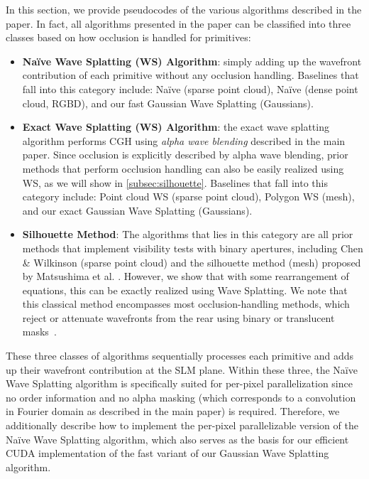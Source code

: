 In this section, we provide pseudocodes of the various algorithms described in the paper. In fact, all algorithms presented in the paper can be classified into three classes based on how occlusion is handled for primitives: 
\begin{itemize}
    \item \textbf{Na\"ive Wave Splatting (WS) Algorithm}: simply adding up the wavefront contribution of each primitive without any occlusion handling. Baselines that fall into this category include: Na\"ive (sparse point cloud), Na\"ive (dense point cloud, RGBD), and our fast Gaussian Wave Splatting (Gaussians). 
    \item  \textbf{Exact Wave Splatting (WS) Algorithm}: the exact wave splatting algorithm performs CGH using \textit{alpha wave blending} described in the main paper. Since occlusion is explicitly described by alpha wave blending, prior methods that perform occlusion handling can also be easily realized using WS, as we will show in \ref{subsec:silhouette}. Baselines that fall into this category include: Point cloud WS (sparse point cloud), Polygon WS (mesh), and our exact Gaussian Wave Splatting (Gaussians). 
    \item \textbf{Silhouette Method}: The algorithms that lies in this category are all prior methods that implement visibility tests with binary apertures, including Chen \& Wilkinson \cite{chen2009computer} (sparse point cloud) and the silhouette method (mesh) proposed by Matsushima et al. \cite{matsushima2014silhouette}. However, we show that with some rearrangement of equations, this can be exactly realized using Wave Splatting. We note that this classical method encompasses most occlusion-handling methods, which reject or attenuate wavefronts from the rear using binary or translucent masks~\cite{chen2009computer, shi2021towards}.  
\end{itemize}


These three classes of algorithms sequentially processes each primitive and adds up their wavefront contribution at the SLM plane. Within these three, the Na\"ive Wave Splatting algorithm is specifically suited for per-pixel parallelization since no order information and no alpha masking (which corresponds to a convolution in Fourier domain as described in the main paper) is required. Therefore, we additionally describe how to implement the per-pixel parallelizable version of the Na\"ive Wave Splatting algorithm, which also serves as  the basis for our efficient CUDA implementation of the fast variant of our Gaussian Wave Splatting algorithm.


